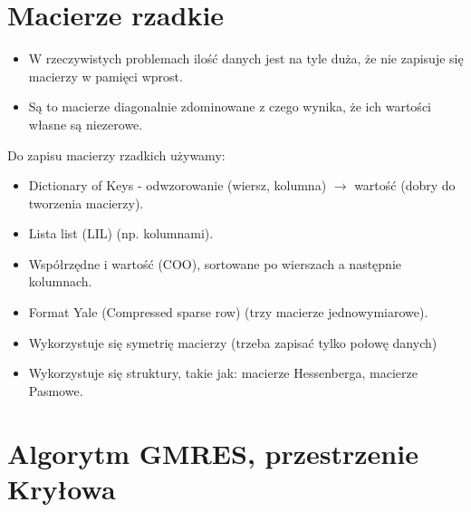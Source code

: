 \documentclass[a4paper]{article}
\begin{document}
\section{Macierze rzadkie}
\begin{itemize}
    \item W rzeczywistych problemach ilość danych jest na tyle duża, że nie zapisuje się macierzy w pamięci wprost.
    \item Są to macierze diagonalnie zdominowane z czego wynika, że ich wartości własne są niezerowe.
\end{itemize}
Do zapisu macierzy rzadkich używamy:
\begin{itemize}
    \item Dictionary of Keys - odwzorowanie (wiersz, kolumna) $\rightarrow$ wartość (dobry do tworzenia macierzy).
    \item Lista list (LIL) (np. kolumnami).
    \item Współrzędne i wartość (COO), sortowane po wierszach a następnie kolumnach.
    \item Format Yale (Compressed sparse row) (trzy macierze jednowymiarowe).
    \item Wykorzystuje się symetrię macierzy (trzeba zapisać tylko połowę danych)
    \item Wykorzystuje się struktury, takie jak: macierze Hessenberga, macierze Pasmowe.
\end{itemize}


\section{Algorytm GMRES, przestrzenie Kryłowa}
\end{document}
